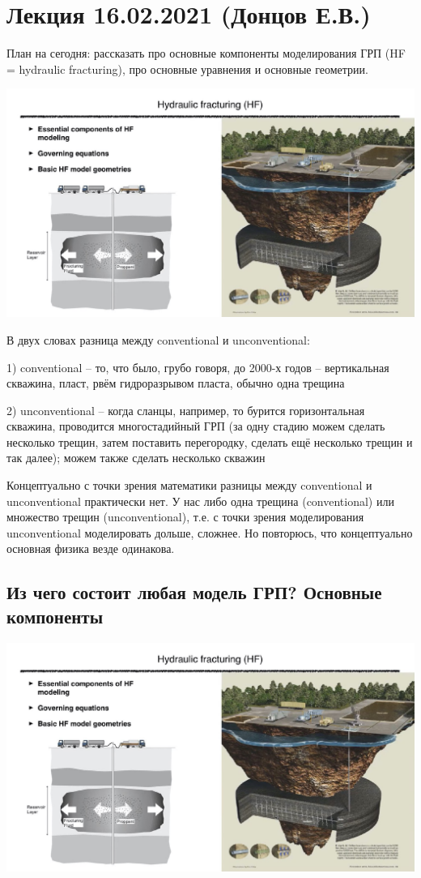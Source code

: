 \documentclass[main.tex]{subfiles}
\begin{document}

\section{Лекция 16.02.2021 (Донцов Е.В.)}

План на сегодня: рассказать про основные компоненты моделирования ГРП (HF = hydraulic fracturing), про основные уравнения и основные геометрии.

\includegraphics[width=\textwidth, page=1]{HF_slides.pdf}

В двух словах разница между conventional и unconventional:

1) conventional -- то, что было, грубо говоря, до 2000-х годов -- вертикальная скважина, пласт, рвём гидроразрывом пласта, обычно одна трещина

2) unconventional -- когда сланцы, например, то бурится горизонтальная скважина, проводится многостадийный ГРП (за одну стадию можем сделать несколько трещин, затем поставить перегородку, сделать ещё несколько трещин и так далее); можем также сделать несколько скважин

Концептуально с точки зрения математики разницы между conventional и unconventional практически нет.
У нас либо одна трещина (conventional) или множество трещин (unconventional), т.е. с точки зрения моделирования unconventional моделировать дольше, сложнее.
Но повторюсь, что концептуально основная физика везде одинакова.

\subsection{Из чего состоит любая модель ГРП? Основные компоненты}

\includegraphics[width=\textwidth, page=2]{HF_slides.pdf}
\end{document}
